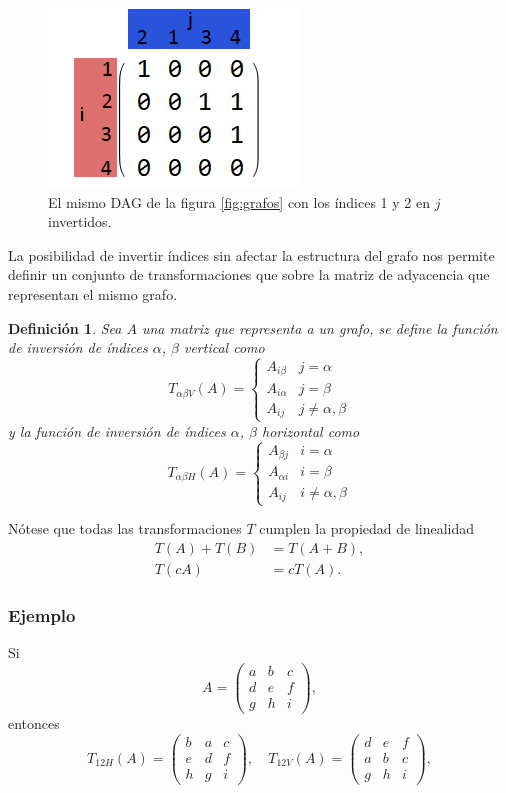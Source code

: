 \documentclass[10pt,a4paper]{article}
\newtheorem{definition1}{Definición}
\begin{document}
\begin{figure}[h!]
\centering
\includegraphics[scale=0.4]{img/t12v_matriz}
\caption{El mismo DAG de la figura \ref{fig:grafos} con los índices 1 y 2 en $j$ invertidos.}
\label{fig:th}
\end{figure}

La posibilidad de invertir índices sin afectar la estructura del grafo nos permite definir un conjunto de transformaciones que sobre la matriz de adyacencia que representan el mismo grafo.

\begin{definition1}
Sea $A$ una matriz que representa a un grafo, se define la función de inversión de índices $\alpha$, $\beta$ vertical como
\[
	T_{\alpha \beta V}(A) = 
	\begin{cases} 
      A_{i \beta} & j = \alpha \\
      A_{i \alpha} & j =  \beta \\
      A_{ij} & j \neq \alpha, \beta
    \end{cases}
\]
y la función de inversión de índices $\alpha$, $\beta$ horizontal como
\[
	T_{\alpha \beta H}(A) = 
	\begin{cases} 
      A_{\beta j} & i = \alpha \\
      A_{\alpha i} & i =  \beta \\
      A_{ij} & i \neq \alpha, \beta
    \end{cases}
\]
\end{definition1}
Nótese que todas las transformaciones $T$ cumplen la propiedad de linealidad
\begin{align*}
	T(A) + T(B) &= T(A+B), \\
	T(cA) &= c T(A).
\end{align*}

\subsubsection*{Ejemplo}
Si
\[
	A = \begin{pmatrix}
		a & b & c \\
		d & e & f \\
		g & h & i
	\end{pmatrix},
\]
entonces
\[
	T_{12H}(A) = \begin{pmatrix}
		b & a & c \\
		e & d & f \\
		h & g & i
	\end{pmatrix},\quad
	T_{12V}(A) = \begin{pmatrix}
		d & e & f \\
		a & b & c \\
		g & h & i
	\end{pmatrix},
\]
\end{document}

